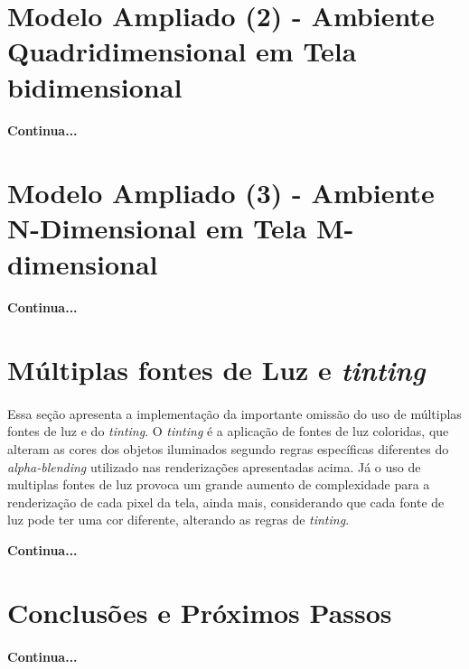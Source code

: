 \documentclass{article}
\begin{document}
	\section{Modelo Ampliado (2) - Ambiente Quadridimensional em Tela bidimensional}
	
	\paragraph{}
	\textbf{Continua...}
	
	\section{Modelo Ampliado (3) - Ambiente N-Dimensional em Tela M-dimensional}
	
	\paragraph{}
	\textbf{Continua...}
	
	\section{Múltiplas fontes de Luz e \textit{tinting}}
	
	\paragraph{}
	Essa seção apresenta a implementação da importante omissão do uso de múltiplas fontes de luz e do \textit{tinting}. O \textit{tinting} é a aplicação de fontes de luz coloridas, que alteram as cores dos objetos iluminados segundo regras específicas diferentes do \textit{alpha-blending} utilizado nas renderizações apresentadas acima. Já o uso de multiplas fontes de luz provoca um grande aumento de complexidade para a renderização de cada pixel da tela, ainda mais, considerando que cada fonte de luz pode ter uma cor diferente, alterando as regras de \textit{tinting}.
	
	\textbf{Continua...}
	
	\section{Conclusões e Próximos Passos}
	
	\paragraph{}
	\textbf{Continua...}

	
\end{document}
